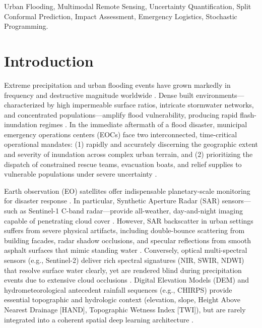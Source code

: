\documentclass[journal]{IEEEtran}
\begin{document}
\begin{IEEEkeywords}
Urban Flooding, Multimodal Remote Sensing, Uncertainty Quantification, Split Conformal Prediction, Impact Assessment, Emergency Logistics, Stochastic Programming.
\end{IEEEkeywords}

\section{Introduction}
\label{sec:intro}

Extreme precipitation and urban flooding events have grown markedly in frequency and destructive magnitude worldwide \cite{bentivoglio2022, cameron2022}. Dense built environments—characterized by high impermeable surface ratios, intricate stormwater networks, and concentrated populations—amplify flood vulnerability, producing rapid flash-inundation regimes \cite{rahnemoonfar2021, li2019flood}. In the immediate aftermath of a flood disaster, municipal emergency operations centers (EOCs) face two interconnected, time-critical operational mandates: (1) rapidly and accurately discerning the geographic extent and severity of inundation across complex urban terrain, and (2) prioritizing the dispatch of constrained rescue teams, evacuation boats, and relief supplies to vulnerable populations under severe uncertainty \cite{sabouhi2019, boonmee2021}.

Earth observation (EO) satellites offer indispensable planetary-scale monitoring for disaster response \cite{gorelick2017}. In particular, Synthetic Aperture Radar (SAR) sensors—such as Sentinel-1 C-band radar—provide all-weather, day-and-night imaging capable of penetrating cloud cover \cite{bonafilia2020sen1floods11, nemni2020, katiyar2021}. However, SAR backscatter in urban settings suffers from severe physical artifacts, including double-bounce scattering from building facades, radar shadow occlusions, and specular reflections from smooth asphalt surfaces that mimic standing water \cite{li2019flood, shen2019}. Conversely, optical multi-spectral sensors (e.g., Sentinel-2) deliver rich spectral signatures (NIR, SWIR, NDWI) that resolve surface water clearly, yet are rendered blind during precipitation events due to extensive cloud occlusions \cite{konapala2021, mateogarcia2021}. Digital Elevation Models (DEM) and hydrometeorological antecedent rainfall sequences (e.g., CHIRPS) provide essential topographic and hydrologic context (elevation, slope, Height Above Nearest Drainage [HAND], Topographic Wetness Index [TWI]), but are rarely integrated into a coherent spatial deep learning architecture \cite{funk2015, zha2023}.
\end{document}
